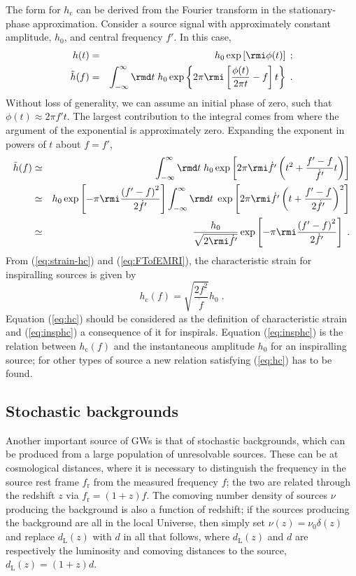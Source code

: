 The form for $h_\mathrm{c}$ can be derived from the Fourier transform in the stationary-phase approximation. Consider a source signal with approximately constant amplitude, $h_0$, and central frequency $f'$. In this case,
\begin{eqnarray}
h(t) &=& h_0\exp\left[\rmi \phi(t)\right] \; ; \\
\tilde{h}(f) &=& \int_{-\infty}^{\infty}\rmd t\; h_0\exp \left\{2\pi \rmi \left[\frac{\phi(t)}{2\pi t}-f\right]t\right\} \; .
\end{eqnarray}
Without loss of generality, we can assume an initial phase of zero, such that $\phi(t) \approx 2\pi f't$. The largest contribution to the integral comes from where the argument of the exponential is approximately zero. Expanding the exponent in powers of $t$ about $f = f'$,
\begin{eqnarray} \label{eq:FTofEMRI}
\tilde{h}(f) &\simeq& \int_{-\infty}^{\infty}\rmd t\; h_0 \exp\left[2\pi\rmi \dot{f'} \left(t^{2}+\frac{f'-f}{\dot{f'}}t\right)\right]\nonumber \\
&\simeq& h_0\exp\left[-\pi\rmi\frac{\left(f'-f\right)^{2}}{2\dot{f'}}\right]\int_{-\infty}^{\infty}\rmd t\;\exp\left[2\pi\rmi\dot{f'}\left(t+\frac{f'-f}{2\dot{f'}}\right)^{2}\right] \nonumber \\
&\simeq& \frac{h_0}{\sqrt{2\rmi\dot{f'}}}\exp\left[-\pi\rmi\frac{\left(f'-f\right)^{2}}{2\dot{f'}}\right]\; .
\end{eqnarray}
From (\ref{eq:strain-hc}) and (\ref{eq:FTofEMRI}), the characteristic strain for inspiralling sources is given by \citep{FinnThorne}
\begin{equation}\label{eq:insphc}
h_\mathrm{c}(f) = \sqrt{\frac{2f^{2}}{\dot{f}}}h_0 \;.
\end{equation}
Equation (\ref{eq:hc}) should be considered as the definition of characteristic strain and (\ref{eq:insphc}) a consequence of it for inspirals. Equation (\ref{eq:insphc}) is the relation between $h_\mathrm{c}(f)$ and the instantaneous amplitude $h_0$ for an inspiralling source; for other types of source a new relation satisfying (\ref{eq:hc}) has to be found.


\subsection{Stochastic backgrounds}\label{sec:stoch}

Another important source of GWs is that of stochastic backgrounds, which can be produced from a large population of unresolvable sources. These can be at cosmological distances, where it is necessary to distinguish the frequency in the source rest frame $f_{\mathrm{r}}$ from the measured frequency $f$; the two are related through the redshift $z$ via $f_{\mathrm{r}}=(1+z)f$. The comoving number density of sources $\nu$ producing the background is also a function of redshift; if the sources producing the background are all in the local Universe, then simply set $\nu(z) = \nu_0\delta (z)$ and replace $d_{\mathrm{L}}(z)$ with $d$ in all that follows, where $d_{\mathrm{L}}(z)$ and $d$ are respectively the luminosity and comoving distances to the source, $d_{\mathrm{L}}(z)=(1+z)d$.

